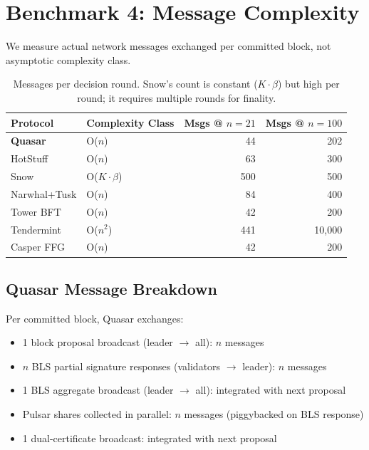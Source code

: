 \section{Benchmark 4: Message Complexity}

\label{sec:messages}

We measure actual network messages exchanged per committed block, not asymptotic
complexity class.

\begin{table}[h]
\centering
\begin{tabular}{@{}llrr@{}}
\toprule
\textbf{Protocol} & \textbf{Complexity Class} & \textbf{Msgs @ $n=21$} & \textbf{Msgs @ $n=100$} \\
\midrule
\textbf{Quasar}   & O($n$)   & 44        & 202 \\
HotStuff          & O($n$)   & 63        & 300 \\
Snow              & O($K \cdot \beta$) & 500 & 500 \\
Narwhal+Tusk      & O($n$)   & 84        & 400 \\
Tower BFT         & O($n$)   & 42        & 200 \\
Tendermint        & O($n^2$) & 441       & 10{,}000 \\
Casper FFG        & O($n$)   & 42        & 200 \\
\bottomrule
\end{tabular}
\caption{Messages per decision round. Snow's count is constant ($K \cdot \beta$) but high
per round; it requires multiple rounds for finality.}
\label{tab:messages}
\end{table}

\subsection{Quasar Message Breakdown}

Per committed block, Quasar exchanges:
\begin{itemize}
\item 1 block proposal broadcast (leader $\to$ all): $n$ messages
\item $n$ BLS partial signature responses (validators $\to$ leader): $n$ messages
\item 1 BLS aggregate broadcast (leader $\to$ all): integrated with next proposal
\item Pulsar shares collected in parallel: $n$ messages (piggybacked on BLS response)
\item 1 dual-certificate broadcast: integrated with next proposal
\end{itemize}

